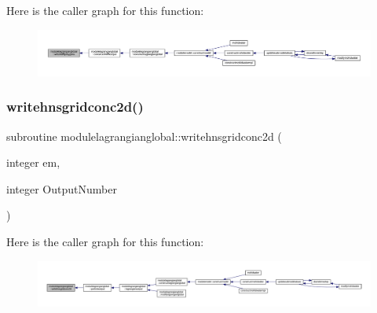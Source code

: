 Here is the caller graph for this function\+:\nopagebreak
\begin{figure}[H]
\begin{center}
\leavevmode
\includegraphics[width=350pt]{namespacemodulelagrangianglobal_a123df5d7675f21137327cf36ed875f91_icgraph}
\end{center}
\end{figure}
\mbox{\label{namespacemodulelagrangianglobal_abb393e682c261146ef53a65a75c60c4a}} 
\subsubsection{\texorpdfstring{writehnsgridconc2d()}{writehnsgridconc2d()}}
{\footnotesize\ttfamily subroutine modulelagrangianglobal\+::writehnsgridconc2d (\begin{DoxyParamCaption}\item[{integer}]{em,  }\item[{integer}]{Output\+Number }\end{DoxyParamCaption})\hspace{0.3cm}{\ttfamily [private]}}

Here is the caller graph for this function\+:\nopagebreak
\begin{figure}[H]
\begin{center}
\leavevmode
\includegraphics[width=350pt]{namespacemodulelagrangianglobal_abb393e682c261146ef53a65a75c60c4a_icgraph}
\end{center}
\end{figure}
\mbox{\label{namespacemodulelagrangianglobal_a94325a61c883247ceef185733a82f5d2}} 

